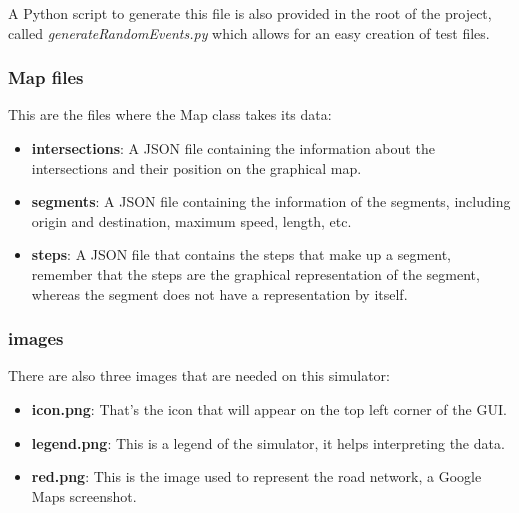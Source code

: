 A Python script to generate this file is also provided in the root of the project, called \emph{generateRandomEvents.py} which allows for an easy creation of test files.

\subsubsection{Map files}

This are the files where the Map class takes its data:

\begin{itemize}
\item \textbf{intersections}: A JSON file containing the information about the intersections and their position on the graphical map.
\item \textbf{segments}: A JSON file containing the information of the segments, including origin and destination, maximum speed, length, etc.
\item \textbf{steps}: A JSON file that contains the steps that make up a segment, remember that the steps are the graphical representation of the segment, whereas the segment does not have a representation by itself.
\end{itemize}

\subsubsection{images}

There are also three images that are needed on this simulator:

\begin{itemize}
\item \textbf{icon.png}: That's the icon that will appear on the top left corner of the GUI.
\item \textbf{legend.png}: This is a legend of the simulator, it helps interpreting the data.
\item \textbf{red.png}: This is the image used to represent the road network, a Google Maps screenshot.
\end{itemize}

